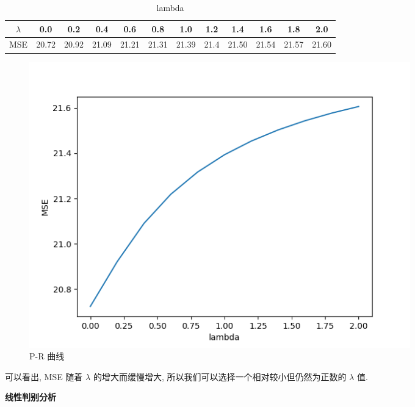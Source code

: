 \documentclass[answers]{exam}  %
\begin{document}
\begin{questions}
\begin{solution}
\begin{enumerate}
            \begin{table}[H]
              \centering
              \caption{lambda} \vspace{2mm}\label{table:roc}
              \begin{tabular}{c|c c c c c c c c c c c}\toprule
                \hline
                $\lambda$ & 0.0 & 0.2 & 0.4 & 0.6 & 0.8 & 1.0 & 1.2 & 1.4 & 1.6 & 1.8 & 2.0  \\ \midrule
                MSE       & 20.72 & 20.92 & 21.09 & 21.21 & 21.31 & 21.39 & 21.4 & 21.50 & 21.54 & 21.57 & 21.60 \\ \midrule
                \bottomrule
              \end{tabular}
            \end{table}

            \begin{figure}[H]
              \centering
              \includegraphics[width=0.8\textwidth]{Figure_1.png}
              \caption{P-R 曲线}
              \label{Fig.main1}
            \end{figure}


            可以看出, MSE 随着 $\lambda$ 的增大而缓慢增大, 所以我们可以选择一个相对较小但仍然为正数的 $\lambda$ 值.
    \end{enumerate}
  \end{solution}

  \question [20] \textbf{线性判别分析}


\end{questions}
\end{document}
